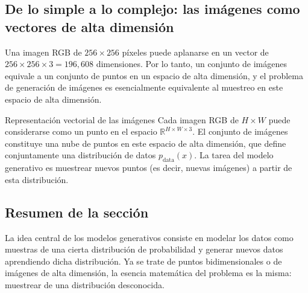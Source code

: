 \subsection{De lo simple a lo complejo: las imágenes como vectores de alta dimensión}

Una imagen RGB de $256 \times 256$ píxeles puede aplanarse en un vector de $256 \times 256 \times 3 = 196{,}608$ dimensiones. Por lo tanto, un conjunto de imágenes equivale a un conjunto de puntos en un espacio de alta dimensión, y el problema de generación de imágenes es esencialmente equivalente al muestreo en este espacio de alta dimensión.

\begin{knowledgebox}{Representación vectorial de las imágenes}
Cada imagen RGB de $H \times W$ puede considerarse como un punto en el espacio $\mathbb{R}^{H \times W \times 3}$. El conjunto de imágenes constituye una nube de puntos en este espacio de alta dimensión, que define conjuntamente una distribución de datos $p_{\text{data}}(x)$. La tarea del modelo generativo es muestrear nuevos puntos (es decir, nuevas imágenes) a partir de esta distribución.
\end{knowledgebox}

\subsection{Resumen de la sección}

La idea central de los modelos generativos consiste en modelar los datos como muestras de una cierta distribución de probabilidad y generar nuevos datos aprendiendo dicha distribución. Ya se trate de puntos bidimensionales o de imágenes de alta dimensión, la esencia matemática del problema es la misma: muestrear de una distribución desconocida.

\newpage
